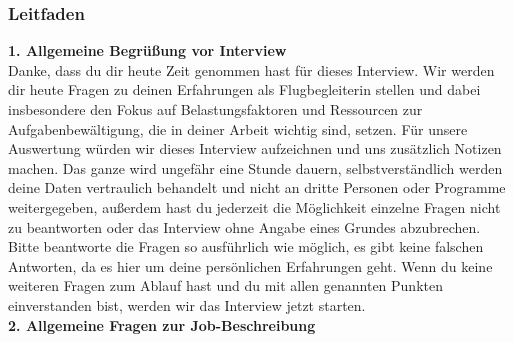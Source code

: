 \documentclass[12pt, a4paper]{article}
\begin{document}
\subsubsection{Leitfaden}

\begin{tcolorbox}[
  breakable,
  colback=gray!10,
  colframe=black,
  arc=10pt,          %
  boxrule=0.5pt,
  left=6pt, right=6pt, top=6pt, bottom=6pt
]

\small

\textbf{1. Allgemeine Begrüßung vor Interview}\\

Danke, dass du dir heute Zeit genommen hast für dieses Interview. Wir werden dir heute
Fragen zu deinen Erfahrungen als Flugbegleiterin stellen und dabei insbesondere den Fokus
auf Belastungsfaktoren und Ressourcen zur Aufgabenbewältigung, die in deiner Arbeit
wichtig sind, setzen. Für unsere Auswertung würden wir dieses Interview aufzeichnen und
uns zusätzlich Notizen machen. Das ganze wird ungefähr eine Stunde dauern,
selbstverständlich werden deine Daten vertraulich behandelt und nicht an dritte Personen
oder Programme weitergegeben, außerdem hast du jederzeit die Möglichkeit einzelne
Fragen nicht zu beantworten oder das Interview ohne Angabe eines Grundes abzubrechen.
Bitte beantworte die Fragen so ausführlich wie möglich, es gibt keine falschen Antworten, da
es hier um deine persönlichen Erfahrungen geht. Wenn du keine weiteren Fragen zum
Ablauf hast und du mit allen genannten Punkten einverstanden bist, werden wir das
Interview jetzt starten.\\

\textbf{2. Allgemeine Fragen zur Job-Beschreibung}


\end{tcolorbox}
\end{document}
